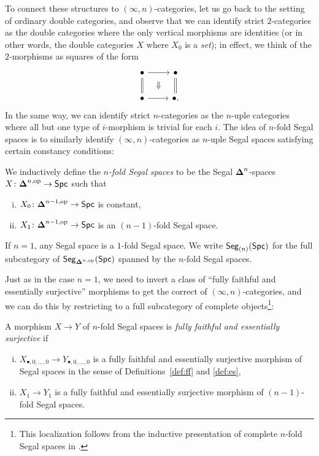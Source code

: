 \documentclass[a4paper,11pt]{article}
\begin{document}
To connect these structures to $(\infty,n)$-categories, let us go back
to the setting of ordinary double categories, and observe that we can
identify strict $2$-categories as the double categories where the only
vertical morphisms are identities (or in other words, the double
categories $X$ where $X_{0}$ is a \emph{set}); in effect, we think of
the $2$-morphisms as squares of the form
\[
  \begin{tikzcd}
    \bullet \ar[r] \ar[d, equals] \ar[dr, phantom, "\Downarrow"] &
    \bullet \ar[d, equals] \\
    \bullet \ar[r] & \bullet.
  \end{tikzcd}
\]
In the same way, we can identify strict $n$-categories as the $n$-uple
categories where all but one type of $i$-morphism is trivial for each
$i$. The idea of $n$-fold Segal spaces is to similarly identify
$(\infty,n)$-categories as $n$-uple Segal spaces satisfying certain
constancy conditions:
\begin{defn}
  We inductively define the \emph{$n$-fold Segal spaces} to be the
  Segal $\boldsymbol{\Delta}^{n}$-spaces $X \colon \simp^{n,\op} \to \Spc$ such that
  \begin{enumerate}[(i)]
  \item $X_{0} \colon \simp^{n-1,\op} \to \Spc$ is constant,
  \item $X_{1} \colon \simp^{n-1,\op} \to \Spc$ is an $(n-1)$-fold
    Segal space.
  \end{enumerate}
  If $n = 1$, any Segal space is a $1$-fold Segal space.  We write
  $\textup{\textsf{Seg}}_{(n)}(\textup{\textsf{Spc}})$ for the full subcategory of $\textup{\textsf{Seg}}_{\boldsymbol{\Delta}^{n,\text{\textup{op}}}}(\textup{\textsf{Spc}})$
  spanned by the $n$-fold Segal spaces.
\end{defn}

Just as in the case $n = 1$, we need to invert a class of ``fully
faithful and essentially surjective'' morphisms to get the correct
\icat{} of $(\infty,n)$-categories, and we can do this by restricting
to a full subcategory of complete objects\footnote{This localization
  follows from the inductive presentation of complete $n$-fold Segal
  spaces in \cite{LurieGoodwillie}.}:
\begin{defn}
  A morphism $X \to Y$ of $n$-fold Segal spaces is \emph{fully
    faithful and essentially surjective} if
  \begin{enumerate}[(i)]
  \item $X_{\bullet,0,\dots,0} \to Y_{\bullet,0,\dots,0}$ is a fully
    faithful and essentially surjective morphism of Segal spaces in
    the sense of Definitions~\ref{def:ff} and \ref{def:es},
  \item $X_{1} \to Y_{1}$ is a fully faithful and essentially
    surjective morphism of $(n-1)$-fold Segal spaces.
  \end{enumerate}
\end{defn}
\end{document}
